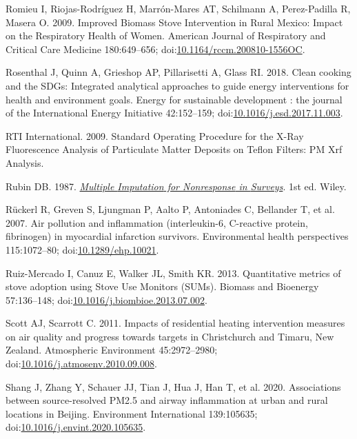 \documentclass[
  letterpaper,
  DIV=11,
  numbers=noendperiod]{scrartcl}
\newlength{\cslhangindent}
\newenvironment{CSLReferences}[2] %
 {\begin{list}{}{%
  \setlength{\itemindent}{0pt}
  \setlength{\leftmargin}{0pt}
  \setlength{\parsep}{0pt}
  \ifodd #1
   \setlength{\leftmargin}{\cslhangindent}
   \setlength{\itemindent}{-1\cslhangindent}
  \fi
  \setlength{\itemsep}{#2\baselineskip}}}
 {\end{list}}
\begin{document}
\begin{CSLReferences}{1}{1}
Romieu I, Riojas-Rodríguez H, Marrón-Mares AT, Schilmann A,
Perez-Padilla R, Masera O. 2009. Improved {Biomass Stove Intervention}
in {Rural Mexico}: {Impact} on the {Respiratory Health} of {Women}.
American Journal of Respiratory and Critical Care Medicine 180:649--656;
doi:\href{https://doi.org/10.1164/rccm.200810-1556OC}{10.1164/rccm.200810-1556OC}.

Rosenthal J, Quinn A, Grieshop AP, Pillarisetti A, Glass RI. 2018. Clean
cooking and the {SDGs}: {Integrated} analytical approaches to guide
energy interventions for health and environment goals. Energy for
sustainable development : the journal of the International Energy
Initiative 42:152--159;
doi:\href{https://doi.org/10.1016/j.esd.2017.11.003}{10.1016/j.esd.2017.11.003}.

RTI International. 2009. Standard {Operating Procedure} for the {X-Ray
Fluorescence Analysis} of {Particulate Matter Deposits} on {Teflon
Filters}: {PM Xrf Analysis}.

Rubin DB. 1987.
\emph{\href{https://doi.org/10.1002/9780470316696}{Multiple {Imputation}
for {Nonresponse} in {Surveys}}}. 1st ed. Wiley.

Rückerl R, Greven S, Ljungman P, Aalto P, Antoniades C, Bellander T, et
al. 2007. Air pollution and inflammation (interleukin-6, {C-reactive}
protein, fibrinogen) in myocardial infarction survivors. Environmental
health perspectives 115:1072--80;
doi:\href{https://doi.org/10.1289/ehp.10021}{10.1289/ehp.10021}.

Ruiz-Mercado I, Canuz E, Walker JL, Smith KR. 2013. Quantitative metrics
of stove adoption using {Stove Use Monitors} ({SUMs}). Biomass and
Bioenergy 57:136--148;
doi:\href{https://doi.org/10.1016/j.biombioe.2013.07.002}{10.1016/j.biombioe.2013.07.002}.

Scott AJ, Scarrott C. 2011. Impacts of residential heating intervention
measures on air quality and progress towards targets in {Christchurch}
and {Timaru}, {New Zealand}. Atmospheric Environment 45:2972--2980;
doi:\href{https://doi.org/10.1016/j.atmosenv.2010.09.008}{10.1016/j.atmosenv.2010.09.008}.

Shang J, Zhang Y, Schauer JJ, Tian J, Hua J, Han T, et al. 2020.
Associations between source-resolved {PM2}.5 and airway inflammation at
urban and rural locations in {Beijing}. Environment International
139:105635;
doi:\href{https://doi.org/10.1016/j.envint.2020.105635}{10.1016/j.envint.2020.105635}.


\end{CSLReferences}
\end{document}
